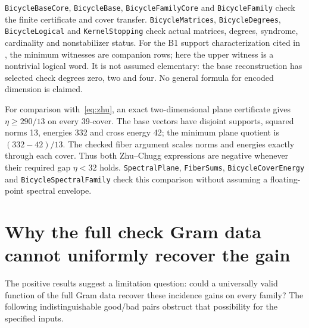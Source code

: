 \documentclass[11pt]{article}
\begin{document}
\texttt{BicycleBaseCore}, \texttt{BicycleBase}, \texttt{BicycleFamilyCore} and
\texttt{BicycleFamily} check the finite certificate and cover transfer.
\texttt{BicycleMatrices}, \texttt{BicycleDegrees}, \texttt{BicycleLogical} and
\texttt{KernelStopping} check actual matrices, degrees, syndrome, cardinality
and nonstabilizer status. For the B1 support characterization cited in \cite{ref7}, the minimum witnesses
are companion rows; here the upper witness is a nontrivial logical word. It is not assumed elementary:
the base reconstruction has selected check degrees zero, two and four.
No general formula for encoded dimension is claimed.

For comparison with~\eqref{eq:zhu}, an exact two-dimensional plane certificate
gives $\eta\ge290/13$ on every 39-cover. The base vectors have disjoint supports,
squared norms 13, energies 332 and cross energy 42; the minimum plane quotient
is $(332-42)/13$. The checked fiber argument scales norms and energies exactly
through each cover. Thus both Zhu--Chugg expressions are negative whenever
their required gap $\eta<32$ holds. \texttt{SpectralPlane}, \texttt{FiberSums},
\texttt{BicycleCoverEnergy} and \texttt{BicycleSpectralFamily} check this
comparison without assuming a floating-point spectral envelope.

\section{Why the full check Gram data cannot uniformly recover the gain}
\label{sec:gram}
The positive results suggest a limitation question: could a universally valid
function of the full Gram data recover these incidence gains on every family?
The following indistinguishable good/bad pairs obstruct that possibility for
the specified inputs.
\end{document}
